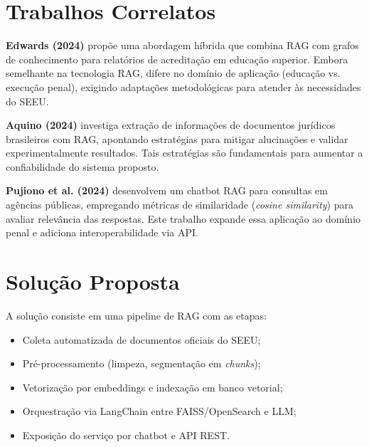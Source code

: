 
\section{Trabalhos Correlatos}
\label{sec:trabalhos-correlatos}

\textbf{Edwards (2024)} propõe uma abordagem híbrida que combina RAG com grafos de conhecimento para relatórios de acreditação em educação superior. Embora semelhante na tecnologia RAG, difere no domínio de aplicação (educação vs. execução penal), exigindo adaptações metodológicas para atender às necessidades do SEEU.

\textbf{Aquino (2024)} investiga extração de informações de documentos jurídicos brasileiros com RAG, apontando estratégias para mitigar alucinações e validar experimentalmente resultados. Tais estratégias são fundamentais para aumentar a confiabilidade do sistema proposto.

\textbf{Pujiono et al. (2024)} desenvolvem um chatbot RAG para consultas em agências públicas, empregando métricas de similaridade (\emph{cosine similarity}) para avaliar relevância das respostas. Este trabalho expande essa aplicação ao domínio penal e adiciona interoperabilidade via API.


\section{Solução Proposta}
\label{sub:solucao-proposta}

A solução consiste em uma pipeline de RAG com as etapas:
\begin{itemize}[label=\textbullet]
  \item Coleta automatizada de documentos oficiais do SEEU;
  \item Pré-processamento (limpeza, segmentação em 
  \emph{chunks});
  \item Vetorização por embeddings e indexação em banco vetorial;
  \item Orquestração via LangChain entre FAISS/OpenSearch e LLM;
  \item Exposição do serviço por chatbot e API REST.
\end{itemize}

